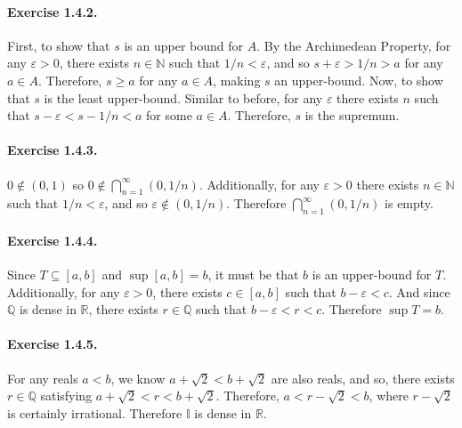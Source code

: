 \documentclass{article}
\newcommand{\N}{\mathbb{N}}
\newcommand{\R}{\mathbb{R}}
\newcommand{\Q}{\mathbb{Q}}
\newcommand{\I}{\mathbb{I}}
\begin{document}
\paragraph{Exercise 1.4.2.}
First, to show that $s$ is an upper bound for $A$. By the Archimedean Property, for any $\varepsilon > 0$, there exists $n\in \N$ such that $1/n < \varepsilon$, and so $s+\varepsilon > 1/n > a$ for any $a \in A$. Therefore, $s\geq a$ for any $a\in A$, making $s$ an upper-bound. Now, to show that $s$ is the least upper-bound. Similar to before, for any $\varepsilon$ there exists $n$ such that $s-\varepsilon < s-1/n < a$ for some $a \in A$. Therefore, $s$ is the supremum.

\paragraph{Exercise 1.4.3.}
$0 \notin (0,1)$ so $0\notin \bigcap_{n=1}^\infty (0,1/n)$. Additionally, for any $\varepsilon > 0$ there exists $n\in \N$ such that $1/n < \varepsilon$, and so $\varepsilon \notin (0,1/n)$. Therefore $\bigcap_{n=1}^\infty (0,1/n)$ is empty.

\paragraph{Exercise 1.4.4.}
Since $T \subseteq [a,b]$ and $\sup[a,b] = b$, it must be that $b$ is an upper-bound for $T$. Additionally, for any $\varepsilon > 0$, there exists $c\in [a,b]$ such that $b-\varepsilon < c$. And since $\Q$ is dense in $\R$, there exists $r\in \Q$ such that $b-\varepsilon < r < c$. Therefore $\sup T = b$.

\paragraph{Exercise 1.4.5.}
For any reals $a<b$, we know $a+\sqrt{2}<b+\sqrt{2}$ are also reals, and so, there exists $r\in \Q$ satisfying $a+\sqrt{2} < r < b+\sqrt{2}$. Therefore, $a < r-\sqrt{2} < b$, where $r-\sqrt{2}$ is certainly irrational. Therefore $\I$ is dense in $\R$.
\end{document}
